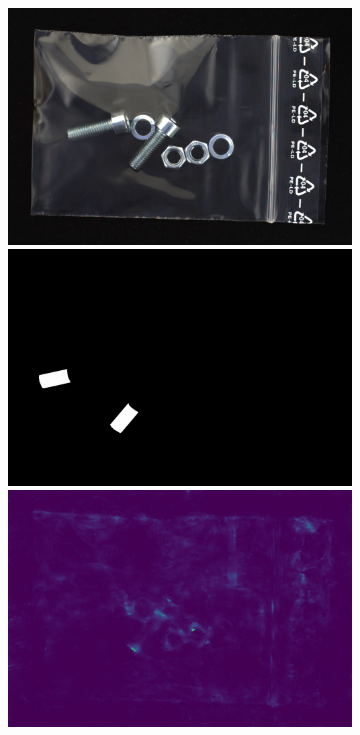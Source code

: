 \begin{figure}[H]
    \begin{subfigure}[b]{\textwidth}
        \centering
        \begin{minipage}{0.45\textwidth}
            \centering
            \includegraphics[width=\textwidth]{figures/appendix/appendix_DRAEM/SB/144.png}
            \includegraphics[width=\textwidth]{figures/appendix/appendix_DRAEM/SB/144m.png}
            \includegraphics[width=\textwidth]{figures/appendix/appendix_DRAEM/SB/144_mask.png}

\end{minipage}
\end{subfigure}
\end{figure}
